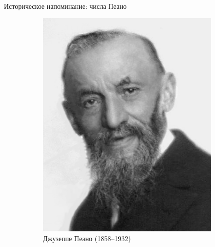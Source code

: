 \begin{frame}{Историческое напоминание: числа Пеано}
\begin{figure}[ht]
\begin{subfigure}[t]{.55\textwidth}
  \end{subfigure}
\hspace{1cm}
\begin{subfigure}[t]{.35\textwidth}
  \begin{minipage}{1\textwidth}
    \includegraphics[width=1\textwidth]{Giuseppe_Peano.jpg}\\
    Джузеппе Пеано (1858--1932)
  \end{minipage}
\end{subfigure}
\end{figure}
\end{frame}



